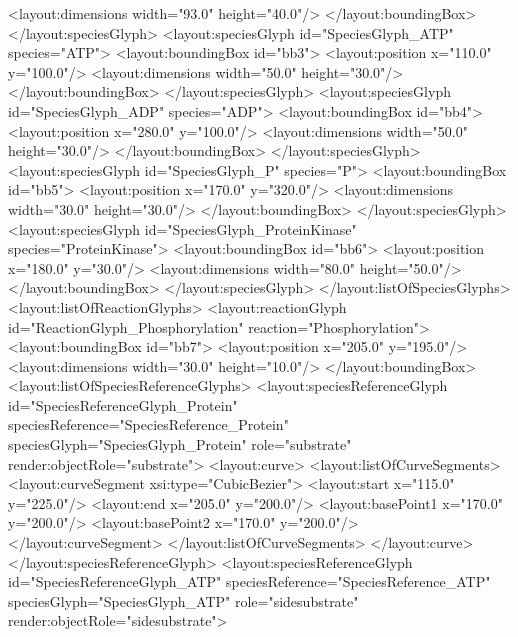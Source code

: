{\begin{example}
       <layout:dimensions width="93.0" height="40.0"/>
      </layout:boundingBox>
     </layout:speciesGlyph>
     <layout:speciesGlyph id="SpeciesGlyph_ATP" species="ATP">
      <layout:boundingBox id="bb3">
       <layout:position x="110.0" y="100.0"/>
       <layout:dimensions width="50.0" height="30.0"/>
      </layout:boundingBox>
     </layout:speciesGlyph>
     <layout:speciesGlyph id="SpeciesGlyph_ADP" species="ADP">
      <layout:boundingBox id="bb4">
       <layout:position x="280.0" y="100.0"/>
       <layout:dimensions width="50.0" height="30.0"/>
      </layout:boundingBox>
     </layout:speciesGlyph>
     <layout:speciesGlyph id="SpeciesGlyph_P" species="P">
      <layout:boundingBox id="bb5">
       <layout:position x="170.0" y="320.0"/>
       <layout:dimensions width="30.0" height="30.0"/>
      </layout:boundingBox>
     </layout:speciesGlyph>
     <layout:speciesGlyph id="SpeciesGlyph_ProteinKinase" 
                         species="ProteinKinase">
      <layout:boundingBox id="bb6">
       <layout:position x="180.0" y="30.0"/>
       <layout:dimensions width="80.0" height="50.0"/>
      </layout:boundingBox>
     </layout:speciesGlyph>
    </layout:listOfSpeciesGlyphs>
    <layout:listOfReactionGlyphs>
     <layout:reactionGlyph id="ReactionGlyph_Phosphorylation"
                           reaction="Phosphorylation">
      <layout:boundingBox id="bb7">
       <layout:position x="205.0" y="195.0"/>
       <layout:dimensions width="30.0" height="10.0"/>
      </layout:boundingBox>
      <layout:listOfSpeciesReferenceGlyphs>
       <layout:speciesReferenceGlyph id="SpeciesReferenceGlyph_Protein" 
                              speciesReference="SpeciesReference_Protein"
                              speciesGlyph="SpeciesGlyph_Protein" 
                              role="substrate" 
                              render:objectRole="substrate">
        <layout:curve>
         <layout:listOfCurveSegments>
          <layout:curveSegment xsi:type="CubicBezier">
           <layout:start x="115.0" y="225.0"/>
           <layout:end x="205.0" y="200.0"/>
           <layout:basePoint1 x="170.0" y="200.0"/>
           <layout:basePoint2 x="170.0" y="200.0"/>
          </layout:curveSegment>
         </layout:listOfCurveSegments>
        </layout:curve>
       </layout:speciesReferenceGlyph>
       <layout:speciesReferenceGlyph id="SpeciesReferenceGlyph_ATP"
                              speciesReference="SpeciesReference_ATP" 
                              speciesGlyph="SpeciesGlyph_ATP"
                              role="sidesubstrate" 
                              render:objectRole="sidesubstrate">

\end{example}}
